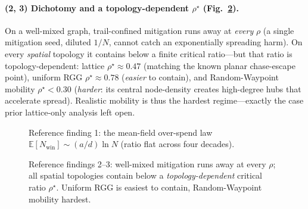 \documentclass[11pt]{article}
\newcommand{\Nwin}{N_{\mathrm{win}}}
\newcommand{\rhoc}{\rho^\star}
\begin{document}
\paragraph{(2, 3) Dichotomy and a topology-dependent $\rhoc$ (Fig.~\ref{fig:topo}).}
On a well-mixed graph, trail-confined mitigation runs away at \emph{every} $\rho$ (a
single mitigation seed, diluted $1/N$, cannot catch an exponentially spreading harm).
On every \emph{spatial} topology it contains below a finite critical ratio---but that
ratio is topology-dependent: lattice $\rhoc\!\approx\!0.47$ (matching the known planar
chase-escape point), uniform RGG $\rhoc\!\approx\!0.78$ (\emph{easier} to contain),
and Random-Waypoint mobility $\rhoc\!<\!0.30$ (\emph{harder}: its central node-density
creates high-degree hubs that accelerate spread). Realistic mobility is thus the
hardest regime---exactly the case prior lattice-only analysis left open.

\begin{figure}[t]\centering
{}
\caption{Reference finding 1: the mean-field over-spend law $\mathbb{E}[\Nwin]\sim
(a/d)\ln N$ (ratio flat across four decades).}\label{fig:lnn}
\end{figure}

\begin{figure}[t]\centering
{}
\caption{Reference findings 2--3: well-mixed mitigation runs away at every $\rho$;
all spatial topologies contain below a \emph{topology-dependent} critical ratio
$\rhoc$. Uniform RGG is easiest to contain, Random-Waypoint mobility hardest.}
\label{fig:topo}
\end{figure}
\end{document}
